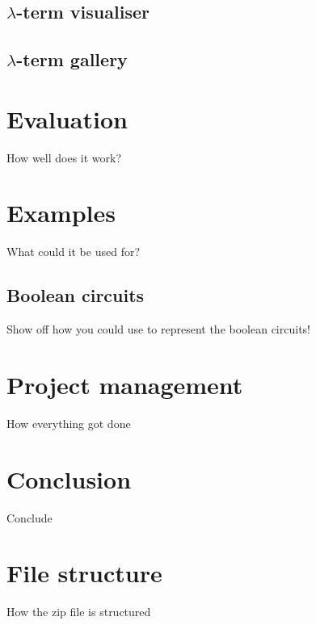 \documentclass[11pt]{article}
\begin{document}
\subsection{\texorpdfstring{$\lambda$}{Lambda}-term visualiser}


\subsection{\texorpdfstring{$\lambda$}{Lambda}-term gallery}


\newpage
\section{Evaluation}
\label{sec:evaluation}
How well does it work?

\newpage
\section{Examples}
What could it be used for?

\subsection{Boolean circuits}
Show off how you could use to represent the boolean circuits!

\newpage

\section{Project management}
\label{sec:project-management}
How everything got done

\newpage
\section{Conclusion}
\label{sec:conclusion}
Conclude

\newpage



\newpage
\appendix

\section{File structure}
How the zip file is structured
\end{document}
